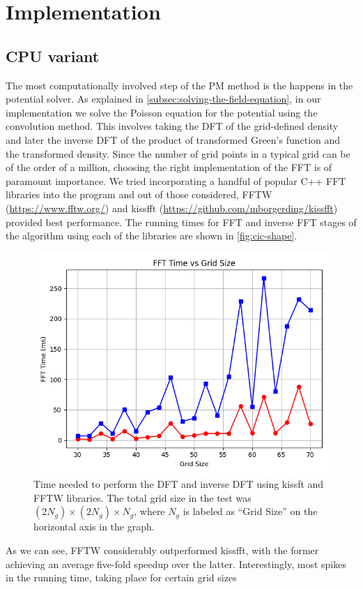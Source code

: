 \section{Implementation}
\subsection{CPU variant}
The most computationally involved step of the PM method is the happens in the potential solver.
As explained in \autoref{subsec:solving-the-field-equation}, in our implementation we solve the Poisson equation for the potential using the convolution method.
This involves taking the DFT of the grid-defined density and later the inverse DFT of the product of transformed Green's function and the transformed density.
Since the number of grid points in a typical grid can be of the order of a million, choosing the right implementation of the FFT is of paramount importance.
We tried incorporating a handful of popular C++ FFT libraries into the program and out of those considered, FFTW (\url{https://www.fftw.org/}) and kissfft (\url{https://github.com/mborgerding/kissfft}) provided best performance.
The running times for FFT and inverse FFT stages of the algorithm using each of the libraries are shown in \autoref{fig:cic-shape}.
\begin{figure}[htp]
    \centering
    \includegraphics[scale=0.5]{chapters/pm-method/img/fft_time.png}
    \caption{Time needed to perform the DFT and inverse DFT using kissft and FFTW libraries.
        The total grid size in the test was $(2N_g)\times (2N_g) \times N_g$, where $N_g$ is labeled as ``Grid Size'' on the horizontal axis in the graph.}
    \label{fig:fft-time}
\end{figure}
As we can see, FFTW considerably outperformed kissfft, with the former achieving an average five-fold speedup over the latter.
Interestingly, most spikes in the running time, taking place for certain grid sizes

